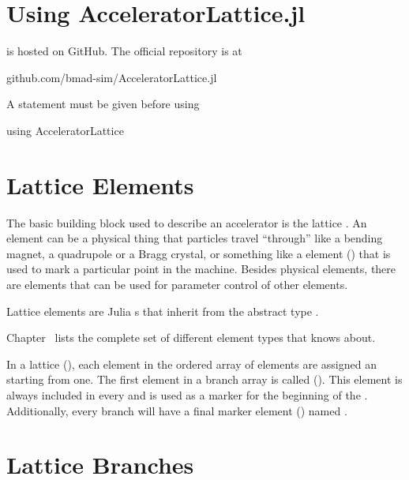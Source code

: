 \section{Using AcceleratorLattice.jl}

\accellat is hosted on GitHub. The official repository is at
\begin{example}
  github.com/bmad-sim/AcceleratorLattice.jl
\end{example}

A  statement must be given before using \accellat
\begin{example}
  using AcceleratorLattice
\end{example}

\section{Lattice Elements}
\label{s:element.def}

The basic building block used to describe an accelerator is the lattice . An
element can be a physical thing that particles travel ``through'' like a bending magnet, a
quadrupole or a Bragg crystal, or something like a  element () that is used
to mark a particular point in the machine.  Besides physical elements, there are 
elements that can be used for parameter control of other elements.

Lattice elements are Julia s that inherit from the abstract type .

Chapter~ lists the complete set of different element types that \bmad knows about.

In a lattice  (), each element in the
ordered array of elements are assigned an 
starting from one. The first element in a branch array
is called  ().
This element is always included in every   and is used as a
marker for the beginning of the .  Additionally, every branch will have a final
marker element () named .

\section{Lattice Branches}
\label{s:branch.def}

